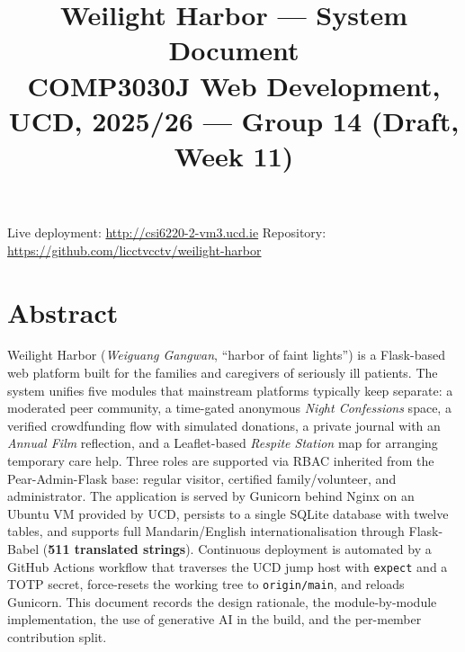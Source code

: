 

\title{\vspace{-1.5cm}\textbf{Weilight Harbor — System Document}\\
       \large COMP3030J Web Development, UCD, 2025/26 — Group 14 (Draft, Week 11)}
\author{}
\date{}


\maketitle
\vspace{-2.0cm}
\begin{center}
  \small
  Live deployment: \url{http://csi6220-2-vm3.ucd.ie} \quad
  Repository: \url{https://github.com/licctvcctv/weilight-harbor}
\end{center}
\vspace{0.4cm}

\section*{Abstract}

Weilight Harbor (\textit{Weiguang Gangwan}, ``harbor of faint lights'') is a Flask-based
web platform built for the families and caregivers of seriously ill patients.
The system unifies five modules that mainstream platforms typically keep
separate: a moderated peer community, a time-gated anonymous \emph{Night
Confessions} space, a verified crowdfunding flow with simulated donations,
a private journal with an \emph{Annual Film} reflection, and a Leaflet-based
\emph{Respite Station} map for arranging temporary care help. Three roles
are supported via RBAC inherited from the Pear-Admin-Flask base: regular
visitor, certified family/volunteer, and administrator. The application is
served by Gunicorn behind Nginx on an Ubuntu VM provided by UCD, persists
to a single SQLite database with twelve tables, and supports full
Mandarin/English internationalisation through Flask-Babel
(\textbf{511 translated strings}). Continuous deployment is automated by a
GitHub Actions workflow that traverses the UCD jump host with
\texttt{expect} and a TOTP secret, force-resets the working tree to
\texttt{origin/main}, and reloads Gunicorn. This document records the
design rationale, the module-by-module implementation, the use of
generative AI in the build, and the per-member contribution split.

